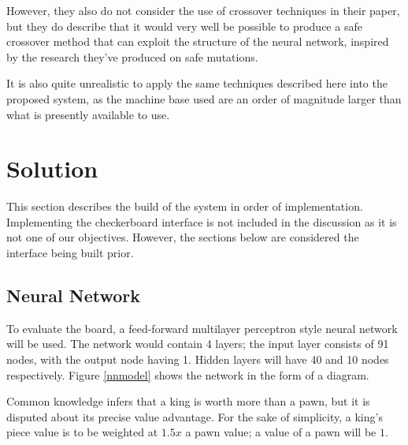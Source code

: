 \documentclass[12pt,a4paper]{article}
\begin{document}
        However, they also do not consider the use of crossover techniques in their paper, but they do describe that it would very well be possible to produce a safe crossover method that can exploit the structure of the neural network, inspired by the research they've produced on safe mutations.

        It is also quite unrealistic to apply the same techniques described here into the proposed system, as the machine base used are an order of magnitude larger than what is presently available to use. 

\section{Solution}


 
    This section describes the build of the system in order of implementation. Implementing the checkerboard interface is not included in the discussion as it is not one of our objectives. However, the sections below are considered the interface being built prior. 

    \subsection{Neural Network}
        To evaluate the board, a feed-forward multilayer perceptron style neural network will be used. The network would contain 4 layers; the input layer consists of 91 nodes, with the output node having 1. Hidden layers will have 40 and 10 nodes respectively. Figure \ref{nnmodel} shows the network in the form of a diagram.

        Common knowledge infers that a king is worth more than a pawn, but it is disputed about its precise value advantage. For the sake of simplicity, a king's piece value is to be weighted at $1.5x$ a pawn value; a value of a pawn will be $1$. 
\end{document}
